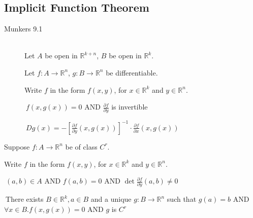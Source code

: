 \subsection{Implicit Function Theorem}
\label{thm_ipft}
\begin{description}
	\item[Munkers 9.1] \hfill \\
		Let $A$ be open in $\mathbb{R}^{k+n}$, $B$ be open in $\mathbb{R}^k$.
		
		Let $f:A\to \mathbb{R}^n$, $g:B\to \mathbb{R}^n$ be differentiable.
		
		Write $f$ in the form $f(x, y)$, for $x\in \mathbb{R}^k$ and $y\in \mathbb{R}^n$.
		
		\thmIF $\ f(x, g(x))=0$ AND $\frac{\partial f}{\partial y}$ is invertible
		
		\thmTHEN $\ Dg(x)=-\left[\frac{\partial f}{\partial y}(x,g(x))\right]^{-1}\cdot \frac{\partial f}{\partial x}(x,g(x))$
\end{description}

Suppose $f:A\to \mathbb{R}^n$ be of class $C^r$.

Write $f$ in the form $f(x, y)$, for $x\in \mathbb{R}^k$ and $y\in \mathbb{R}^n$.

\thmIF $\ (a, b)\in A$ AND $f(a, b)=0$ AND $\det \frac{\partial f}{\partial y}(a,b)\neq 0$

\thmTHEN $\ $There exists $B\in \mathbb{R}^k, a \in B$ and a unique $g:B\to \mathbb{R}^n$ such that
		$g(a)=b$ AND $\forall x\in B. f(x,g(x))=0$ AND $g$ is $C^r$